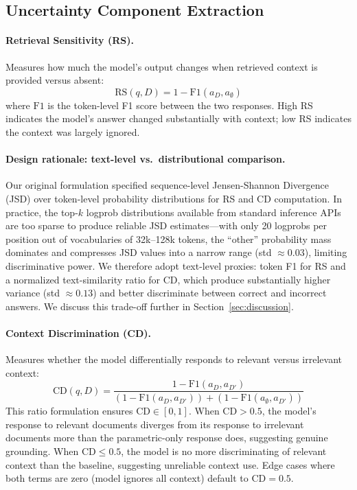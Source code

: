 \documentclass{article}
\newcommand{\RS}{\mathrm{RS}}
\newcommand{\CD}{\mathrm{CD}}
\begin{document}
\subsection{Uncertainty Component Extraction}

\paragraph{Retrieval Sensitivity (RS).}
Measures how much the model's output changes when retrieved context is provided versus absent:
\begin{equation}
    \RS(q, D) = 1 - \mathrm{F1}(a_D, a_\emptyset)
\end{equation}
where $\mathrm{F1}$ is the token-level F1 score between the two responses.
High RS indicates the model's answer changed substantially with context; low RS indicates the context was largely ignored.

\paragraph{Design rationale: text-level vs.\ distributional comparison.}
Our original formulation specified sequence-level Jensen-Shannon Divergence (JSD) over token-level probability distributions for RS and CD computation.
In practice, the top-$k$ logprob distributions available from standard inference APIs are too sparse to produce reliable JSD estimates---with only 20 logprobs per position out of vocabularies of 32k--128k tokens, the ``other'' probability mass dominates and compresses JSD values into a narrow range (std $\approx 0.03$), limiting discriminative power.
We therefore adopt text-level proxies: token F1 for RS and a normalized text-similarity ratio for CD, which produce substantially higher variance (std $\approx 0.13$) and better discriminate between correct and incorrect answers.
We discuss this trade-off further in Section~\ref{sec:discussion}.

\paragraph{Context Discrimination (CD).}
Measures whether the model differentially responds to relevant versus irrelevant context:
\begin{equation}
    \CD(q, D) = \frac{1 - \mathrm{F1}(a_D, a_{D'})}{(1 - \mathrm{F1}(a_D, a_{D'})) + (1 - \mathrm{F1}(a_\emptyset, a_{D'}))}
\end{equation}
This ratio formulation ensures $\CD \in [0, 1]$.
When $\CD > 0.5$, the model's response to relevant documents diverges from its response to irrelevant documents more than the parametric-only response does, suggesting genuine grounding.
When $\CD \leq 0.5$, the model is no more discriminating of relevant context than the baseline, suggesting unreliable context use.
Edge cases where both terms are zero (model ignores all context) default to $\CD = 0.5$.
\end{document}
